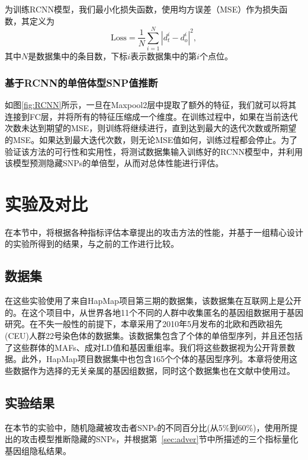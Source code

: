 为训练RCNN模型，我们最小化损失函数，使用均方误差（MSE）作为损失函数，其定义为
\begin{equation}
\text{Loss}=\frac{1}{N}\sum_{i=1}^{N}|d_{t}^{i}-d_{o}^{i}|^{2},
\end{equation}
其中$N$是数据集中的条目数，下标$i$表示数据集中的第$i$个点位。

\subsubsection{基于RCNN的单倍体型SNP值推断}
如图\ref{fig:RCNN}所示，一旦在Maxpool2层中提取了额外的特征，我们就可以将其连接到FC层，并将所有的特征压缩成一个维度。在训练过程中，如果在当前迭代次数未达到期望的MSE，则训练将继续进行，直到达到最大的迭代次数或所期望的MSE。如果达到最大迭代次数，则无论MSE值如何，训练过程都会停止。为了验证该方法的可行性和实用性，将测试数据集输入训练好的RCNN模型中，并利用该模型预测隐藏SNPs的单倍型，从而对总体性能进行评估。


\section{实验及对比}\label{sec:resul}
在本节中，将根据各种指标评估本章提出的攻击方法的性能，并基于一组精心设计的实验所得到的结果，与之前的工作进行比较。

\subsection{数据集}
在这些实验使用了来自HapMap项目\cite{thorisson2005international}第三期的数据集，该数据集在互联网上是公开的。在这个项目中，从世界各地11个不同的人群中收集匿名的基因组数据用于基因研究。在不失一般性的前提下，本章采用了2010年5月发布的北欧和西欧祖先(CEU)人群22号染色体的数据集。该数据集包含了个体的单倍型序列，并且还包括了这些群体的MAFs、成对LD值和基因重组率。我们将这些数据视为公开背景数据。此外，HapMap项目数据集中也包含165个个体的基因型序列。本章将使用这些数据作为选择的无关亲属的基因组数据，同时这个数据集也在文献\cite{samani2015quantifying}中使用过。
\subsection{实验结果}

在本节的实验中，随机隐藏被攻击者SNPs的不同百分比(从5\%到60\%)，使用所提出的攻击模型推断隐藏的SNPs，并根据第~\ref{sec:adver}节中所描述的三个指标量化基因组隐私结果。

